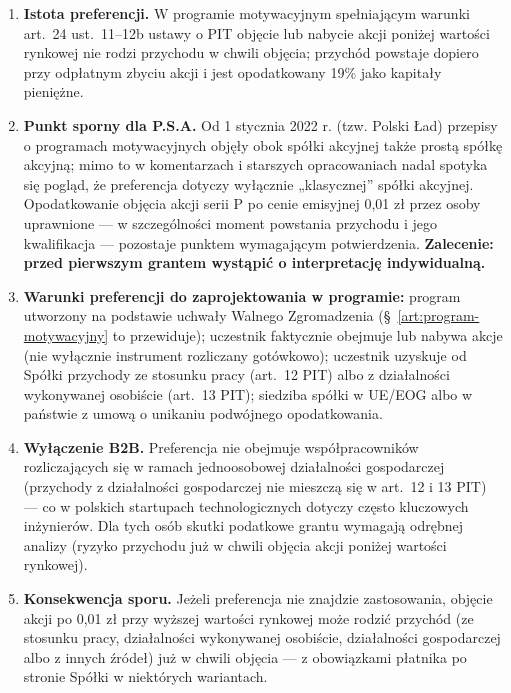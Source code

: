 \documentclass[12pt,a4paper]{report}
\begin{document}
\begin{enumerate}
  \item \textbf{Istota preferencji.} W programie motywacyjnym spełniającym warunki art.~24 ust.~11--12b ustawy o PIT objęcie lub nabycie akcji poniżej wartości rynkowej nie rodzi przychodu w chwili objęcia; przychód powstaje dopiero przy odpłatnym zbyciu akcji i jest opodatkowany 19\% jako kapitały pieniężne.
  \item \textbf{Punkt sporny dla P.S.A.} Od 1 stycznia 2022 r. (tzw. Polski Ład) przepisy o programach motywacyjnych objęły obok spółki akcyjnej także prostą spółkę akcyjną; mimo to w komentarzach i starszych opracowaniach nadal spotyka się pogląd, że preferencja dotyczy wyłącznie „klasycznej” spółki akcyjnej. Opodatkowanie objęcia akcji serii P po cenie emisyjnej 0,01 zł przez osoby uprawnione --- w szczególności moment powstania przychodu i jego kwalifikacja --- pozostaje punktem wymagającym potwierdzenia. \textbf{Zalecenie: przed pierwszym grantem wystąpić o interpretację indywidualną.}
  \item \textbf{Warunki preferencji do zaprojektowania w programie:} program utworzony na podstawie uchwały Walnego Zgromadzenia (§~\ref{art:program-motywacyjny} to przewiduje); uczestnik faktycznie obejmuje lub nabywa akcje (nie wyłącznie instrument rozliczany gotówkowo); uczestnik uzyskuje od Spółki przychody ze stosunku pracy (art.~12 PIT) albo z działalności wykonywanej osobiście (art.~13 PIT); siedziba spółki w UE/EOG albo w państwie z umową o unikaniu podwójnego opodatkowania.
  \item \textbf{Wyłączenie B2B.} Preferencja nie obejmuje współpracowników rozliczających się w ramach jednoosobowej działalności gospodarczej (przychody z działalności gospodarczej nie mieszczą się w art.~12 i 13 PIT) --- co w polskich startupach technologicznych dotyczy często kluczowych inżynierów. Dla tych osób skutki podatkowe grantu wymagają odrębnej analizy (ryzyko przychodu już w chwili objęcia akcji poniżej wartości rynkowej).
  \item \textbf{Konsekwencja sporu.} Jeżeli preferencja nie znajdzie zastosowania, objęcie akcji po 0,01 zł przy wyższej wartości rynkowej może rodzić przychód (ze stosunku pracy, działalności wykonywanej osobiście, działalności gospodarczej albo z innych źródeł) już w chwili objęcia --- z obowiązkami płatnika po stronie Spółki w niektórych wariantach.
\end{enumerate}
\end{document}
